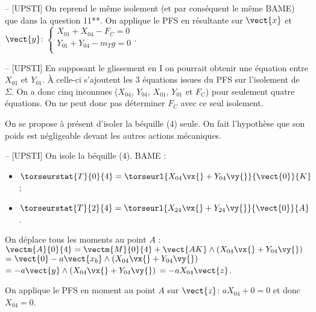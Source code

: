 \ifprof
\begin{corrige}-- [UPSTI]
On reprend le même isolement (et par conséquent le même BAME) que dans la question 11**.
On applique le PFS en résultante sur $\vect{x}$ et $\vect{y}$:
$\left\{
\begin{array}{l}
X_{01}+X_{04}-F_C=0 \\
Y_{01}+Y_{04}-m_T g=0 \\
\end{array}
\right.
$.

\end{corrige}
\else
\fi
\ifprof
\begin{corrige}-- [UPSTI]
En supposant le glissement en I on pourrait obtenir une équation entre $X_{01}$ et $Y_{01}$. À celle-ci s’ajoutent les 3 équations issues du PFS sur l’isolement de $\Sigma$. On a donc cinq inconnues ($X_{04}$, $Y_{04}$, $X_{01}$, $Y_{01}$ et $F_C$) pour seulement quatre équations. On ne peut donc pas déterminer $F_C$ avec ce seul isolement.
\end{corrige}
\else
\fi

On se propose à présent d'isoler la béquille (4) seule. On fait l'hypothèse que son poids est négligeable devant les autres actions mécaniques.
\ifprof
\begin{corrige}-- [UPSTI]
On isole la béquille (4).
BAME :
\begin{itemize}
\item $\torseurstat{T}{0}{4} = \torseurl{X_{04}\vx{}+Y_{04}\vy{}}{\vect{0}}{K}$;
\item $\torseurstat{T}{2}{4}= \torseurl{X_{24}\vx{}+Y_{24}\vy{}}{\vect{0}}{A}$.
\end{itemize}
 
On déplace tous les moments au point $A$ :
$\vectm{A}{0}{4}=\vectm{M}{0}{4}+\vect{AK}\wedge \left(X_{04}\vx{}+Y_{04}\vy{}\right)$
$=\vect{0}  - a \vect{x_b} \wedge \left(X_{04}\vx{}+Y_{04}\vy{}\right)$
$=- a \vect{y} \wedge \left(X_{04}\vx{}+Y_{04}\vy{}\right)$
$=-aX_{04} \vect{z}$.

On applique le PFS en moment au point 
$A$ sur 
$\vect{z}$: 
$aX_{04}+0=0$ et donc 
$X_{04}=0$.

\end{corrige}
\else
\fi

